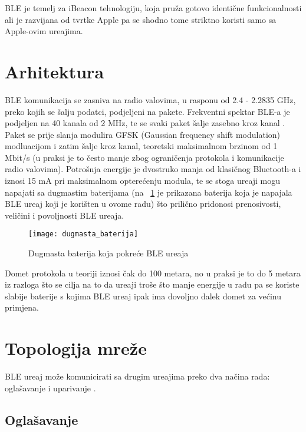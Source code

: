BLE je temelj za iBeacon tehnologiju, koja pru\v{z}a gotovo identi\v{c}ne funkcionalnosti ali je razvijana od tvrtke Apple pa se shodno tome striktno koristi samo sa Apple-ovim ure\dj ajima.

\section{Arhitektura}

BLE komunikacija se zasniva na radio valovima, u rasponu od 2.4 - 2.2835 GHz, preko kojih se \v{s}alju podatci, podjeljeni na pakete. Frekventni spektar BLE-a je podjeljen na 40 kanala od 2 MHz, te se svaki paket \v{s}alje zasebno kroz kanal \cite{ble_introduction}. Paket se prije slanja modulira GFSK (Gaussian frequency shift modulation) modluacijom i zatim \v{s}alje kroz kanal, teoretski maksimalnom brzinom od 1 Mbit/s (u praksi je to \v{c}esto manje zbog ograni\v{c}enja protokola i komunikacije radio valovima). Potro\v{s}nja energije je dvostruko manja od klasi\v{c}nog Bluetooth-a i iznosi 15 mA pri maksimalnom optere\'{c}enju modula, te se stoga ure\dj aji mogu napajati sa dugmastim baterijama (na ~\ref{fig:ble_baterija} je prikazana baterija koja je napajala BLE ure\dj aj koji je kori\v{s}ten u ovome radu) \v{s}to prili\v{c}no pridonosi prenosivosti, veli\v{c}ini i povoljnosti BLE ure\dj aja.


\begin{figure}[!htbp]
	\begin{center}
 \texttt{[image: dugmasta\_baterija]}
 \caption{Dugmasta baterija koja pokre\'{c}e BLE ure\dj aja}
 \label{fig:ble_baterija}
	\end{center}
\end{figure}

Domet protokola u teoriji iznosi \v{c}ak do 100 metara, no u praksi je to do 5 metara iz razloga \v{s}to se cilja na to da ure\dj aji tro\v{s}e \v{s}to manje energije u radu pa se koriste slabije baterije s kojima BLE ure\dj aj ipak ima dovoljno dalek domet za ve\'{c}inu primjena.


\section{Topologija mre\v{z}e}

BLE ure\dj aj mo\v{z}e komunicirati sa drugim ure\dj ajima preko dva na\v{c}ina rada: ogla\v{s}avanje i uparivanje \cite{ble_getting_started}.

\subsection{Ogla\v{s}avanje}

